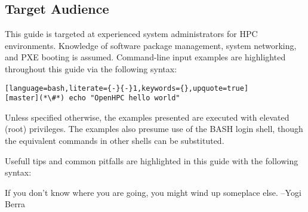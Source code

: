 \subsection{Target Audience}

This guide is targeted at experienced \Linux{} system administrators for HPC
environments. Knowledge of software package management, system networking, and
PXE booting is assumed.  Command-line input examples are highlighted throughout
this guide via the following syntax:

\begin{lstlisting}[language=bash,literate={-}{-}1,keywords={},upquote=true]
[master](*\#*) echo "OpenHPC hello world"
\end{lstlisting}

Unless specified otherwise, the examples presented are executed with
elevated (root) privileges. The examples also presume use of the BASH login
shell, though the equivalent commands in other shells can be substituted.

Usefull tips and common pitfalls are highlighted in this guide with the
following syntax:

\begin{center}
\begin{tcolorbox}[]
\small
If you don't know where you are going, you might wind up someplace else.
--Yogi Berra
\end{tcolorbox}
\end{center}

